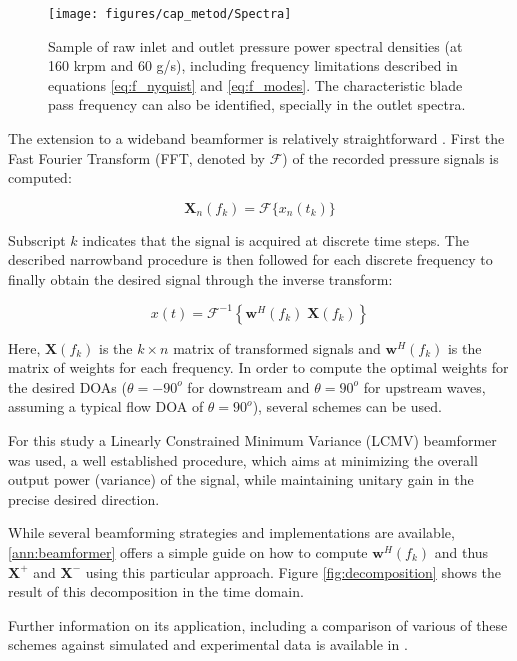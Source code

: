 \begin{figure*}[t!]
\texttt{[image: figures/cap\_metod/Spectra]}
\caption{Sample of raw inlet and outlet pressure power spectral densities (at 160 krpm and 60 g/s), including frequency limitations described in equations \ref{eq:f_nyquist} and \ref{eq:f_modes}. The characteristic blade pass frequency can also be identified, specially in the outlet spectra.}
\label{fig:spectra}
\end{figure*}

The extension to a wideband beamformer is relatively straightforward \cite{piper2011broadband}. First the Fast Fourier Transform (FFT, denoted by $\mathcal F$) of the recorded pressure signals is computed:

\begin{equation}
  \mathbf X_n(f_k)=\mathcal{F}\{x_n(t_k)\}
\end{equation}

Subscript $k$ indicates that the signal is acquired at discrete time steps. The described narrowband procedure is then followed for each discrete frequency to finally obtain the desired signal through the inverse transform:

\begin{equation}
    x(t)=\mathcal{F}^{-1}\left\{\mathbf w^H(f_k)\; \mathbf X(f_k)\right\}
\end{equation}

Here, $\mathbf X(f_k)$ is the $k \times n$ matrix of transformed signals and $\mathbf w^H(f_k)$ is the matrix of weights for each frequency. In order to compute the optimal weights for the desired DOAs ($\theta=-90^o$ for downstream and $\theta=90^o$ for upstream waves, assuming a typical flow DOA of $\theta=90^o$), several schemes can be used.

For this study a Linearly Constrained Minimum Variance (LCMV) beamformer was  used, a well established procedure, which aims at minimizing the overall output power (variance) of the signal, while maintaining unitary gain in the precise desired direction.

While several beamforming strategies and implementations are available, \ref{ann:beamformer} offers a simple guide on how to compute $\mathbf w^H(f_k)$ and thus $\mathbf X^+$ and $\mathbf X^-$ using this particular approach. Figure \ref{fig:decomposition} shows the result of this decomposition in the time domain.

Further information on its application, including a comparison of various of these schemes against simulated and experimental data is available in \cite{pinero2000estimation}.

